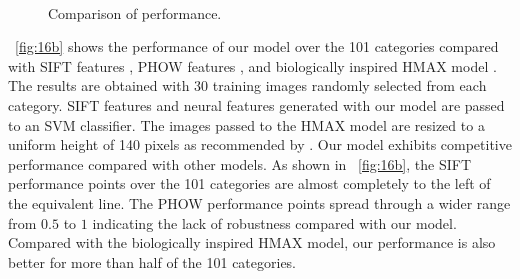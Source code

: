 \documentclass[10pt]{article}
\begin{document}
\begin{figure}
\centering
  \\
\caption{Comparison of performance.}
\label{fig:16}
\end{figure}

\figurename~\ref{fig:16b} shows
the performance of our model over the 101 categories
compared with SIFT features \cite{lowe1999},
PHOW features \cite{lazebnik2006},
and biologically inspired HMAX model \cite{serre2007}.
The results are obtained with 30 training images randomly selected 
from each category.
SIFT features and neural features generated with our model
are passed to an SVM classifier.
The images passed to the HMAX model are resized 
to a uniform height of 140 pixels as recommended by \cite{serre2007}.
Our model exhibits competitive performance 
compared with other models.
As shown in \figurename~\ref{fig:16b},
the SIFT performance points over the 101 categories
are almost completely to the left of the equivalent line.
The PHOW performance points spread through 
a wider range from $0.5$ to $1$ indicating 
the lack of robustness compared with our model.
Compared with the biologically inspired HMAX model,
our performance is also better for more than half
of the 101 categories.
\end{document}
